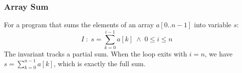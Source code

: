 \subsubsection{Array Sum}

For a program that sums the elements of an array $a[0..n-1]$ into
variable $s$:
\[
  I \;:\; s = \sum_{k=0}^{i-1} a[k] \;\wedge\; 0 \leq i \leq n
\]
The invariant tracks a partial sum. When the loop exits with $i = n$,
we have $s = \sum_{k=0}^{n-1} a[k]$, which is exactly the full sum.





